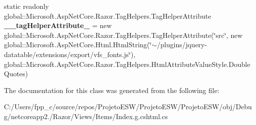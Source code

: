 \begin{DoxyCompactItemize}
\item 
\mbox{\label{class_asp_net_core_1_1_views___items___index_ac66d3c3da2fd07a609c97479b4948e60}} 
static readonly global\+::\+Microsoft.\+Asp\+Net\+Core.\+Razor.\+Tag\+Helpers.\+Tag\+Helper\+Attribute {\bfseries \+\_\+\+\_\+tag\+Helper\+Attribute\+\_} = new global\+::\+Microsoft.\+Asp\+Net\+Core.\+Razor.\+Tag\+Helpers.\+Tag\+Helper\+Attribute(\char`\"{}src\char`\"{}, new global\+::\+Microsoft.\+Asp\+Net\+Core.\+Html.\+Html\+String(\char`\"{}$\sim$/plugins/jquery-\/datatable/extensions/export/vfs\+\_\+fonts.\+js\char`\"{}), global\+::\+Microsoft.\+Asp\+Net\+Core.\+Razor.\+Tag\+Helpers.\+Html\+Attribute\+Value\+Style.\+Double\+Quotes)
\end{DoxyCompactItemize}


The documentation for this class was generated from the following file\+:\begin{DoxyCompactItemize}
\item 
C\+:/\+Users/fpp\+\_\+c/source/repos/\+Projeto\+E\+S\+W/\+Projeto\+E\+S\+W/\+Projeto\+E\+S\+W/obj/\+Debug/netcoreapp2./\+Razor/\+Views/\+Items/Index.\+g.\+cshtml.\+cs\end{DoxyCompactItemize}
